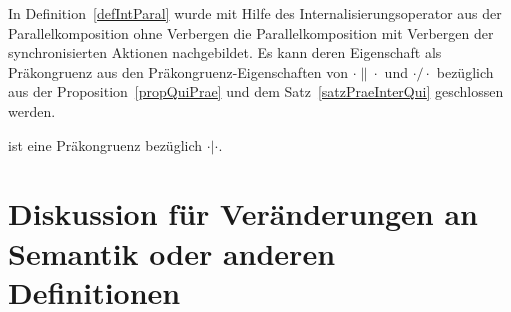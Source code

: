 In Definition~\ref{defIntParal} wurde mit Hilfe des Internalisierungsoperator
aus der Parallelkomposition ohne Verbergen die Parallelkomposition mit
Verbergen der synchronisierten Aktionen nachgebildet. Es kann deren
Eigenschaft als Präkongruenz aus den Präkongruenz-Eigenschaften von
$\cdot\|\cdot$ und $\cdot /\cdot$ bezüglich \QRel{} aus der
Proposition~\ref{propQuiPrae} und dem Satz~\ref{satzPraeInterQui} geschlossen
werden.

\begin{kor}
  \QRel{} ist eine Präkongruenz bezüglich $\cdot |\cdot$.
\end{kor}

\section{Diskussion für Veränderungen an Semantik oder anderen Definitionen}

